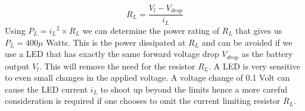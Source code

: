 %
\begin{equation}\label{eq:load}
 R_L = \frac{V_l - V_{drop}}{i_L}
\end{equation}
%
Using $P_L = {i_L}^2 \times R_L $ we can determine the power rating of $R_L$ that gives us $P_L = 400 \mu$ Watts. This is the power dissipated at $R_L$ and can be avoided if we use a LED that has exactly the same forward voltage drop $V_{drop}$ as the battery output $V_l$. This will remove the need for the resistor $R_L$. A LED is very sensitive to even small changes in the applied voltage. A voltage change of 0.1 Volt can cause the LED current $i_L$ to shoot up beyond the limits hence a more careful consideration is required if one chooses to omit the current limiting resistor $R_L$.
